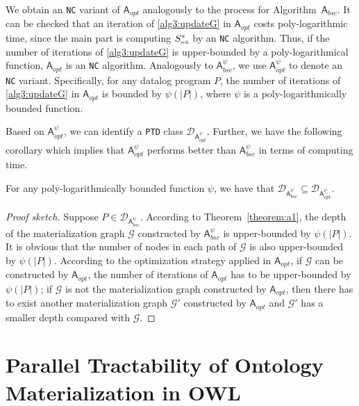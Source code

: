 \documentclass[final,1p,times]{elsarticle}
\begin{document}
We obtain an \texttt{NC} variant of $\mathsf{A}_{opt}$ analogously to the process for Algorithm~$\mathsf{A}_{bsc}$.
It can be checked that an iteration of \ref{alg3:updateG} in $\mathsf{A}_{opt}$ costs poly-logarithmic
time, since the main part is computing $S^*_{\textit{\tiny rch}}$ by an \texttt{NC} algorithm.
Thus, if the number of iterations of \ref{alg3:updateG} is upper-bounded by a poly-logarithmical function,
$\mathsf{A}_{opt}$ is an \texttt{NC} algorithm.
Analogously to $\mathsf{A}_{bsc}^{\psi}$, we use $\mathsf{A}_{opt}^{\psi}$ to denote an \texttt{NC} variant.
Specifically, for any datalog program $P$, the number of iterations of \ref{alg3:updateG} in $\mathsf{A}_{opt}$
is bounded by $\psi(|P|)$, where $\psi$ is a poly-logarithmically bounded function.

Based on $\mathsf{A}_{opt}^{\psi}$, we can identify a \texttt{PTD} class $\mathcal{D}_{\mathsf{A}_{opt}^{\psi}}$.
Further, we have the following corollary which implies that $\mathsf{A}_{opt}^{\psi}$ performs better
than $\mathsf{A}_{bsc}^{\psi}$ in terms of computing time.

\begin{corollary}
For any poly-logarithmically bounded function $\psi$,
we have that $\mathcal{D}_{\mathsf{A}_{bsc}^{\psi}}\subseteq\mathcal{D}_{\mathsf{A}_{opt}^{\psi}}$.
\end{corollary}

\begin{proof}[Proof sketch]
Suppose $P\in\mathcal{D}_{\mathsf{A}_{bsc}^{\psi}}$. According to Theorem~\ref{theorem:a1},
the depth of the materialization graph $\mathcal{G}$ constructed by $\mathsf{A}_{bsc}^{\psi}$ is upper-bounded by $\psi(|P|)$.
It is obvious that the number of nodes in each path of $\mathcal{G}$ is also upper-bounded by $\psi(|P|)$.
According to the optimization strategy applied in $\mathsf{A}_{opt}$, if $\mathcal{G}$ can be constructed
by $\mathsf{A}_{opt}$, the number of iterations of $\mathsf{A}_{opt}$ has to be upper-bounded by $\psi(|P|)$;
if $\mathcal{G}$ is not the materialization graph constructed
by $\mathsf{A}_{opt}$, then there has to exist another materialization graph $\mathcal{G}'$ constructed by $\mathsf{A}_{opt}$
and $\mathcal{G}'$ has a smaller depth compared with $\mathcal{G}$.
\end{proof}


\section{Parallel Tractability of Ontology Materialization in OWL}
\label{sec:ptonto}
\end{document}
